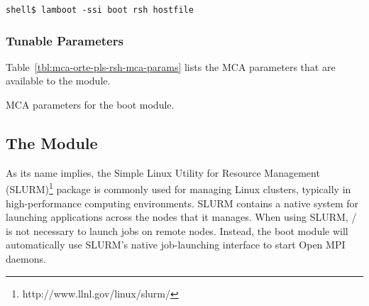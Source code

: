 \lstset{style=lam-cmdline}
\begin{lstlisting}
shell$ lamboot -ssi boot rsh hostfile
\end{lstlisting}


\subsubsection{Tunable Parameters}


Table~\ref{tbl:mca-orte-pls-rsh-mca-params} lists the MCA parameters that
are available to the  module.


\begin{table}[htbp]
  \begin{ssiparamtb}
%
% 
     
%
%
%
  \end{ssiparamtb}
  \caption{MCA parameters for the  boot module.}
  \label{tbl:mca-orte-pls-rsh-mca-params}
\end{table}


\subsection{The  Module}


As its name implies, the Simple Linux Utility for Resource Management
(SLURM)\footnote{http://www.llnl.gov/linux/slurm/} package is commonly
used for managing Linux clusters, typically in high-performance
computing environments.  SLURM contains a native system for launching
applications across the nodes that it manages.  When using SLURM,
/ is not necessary to launch jobs on remote nodes.
Instead, the  boot module will automatically use SLURM's
native job-launching interface to start Open MPI daemons.

